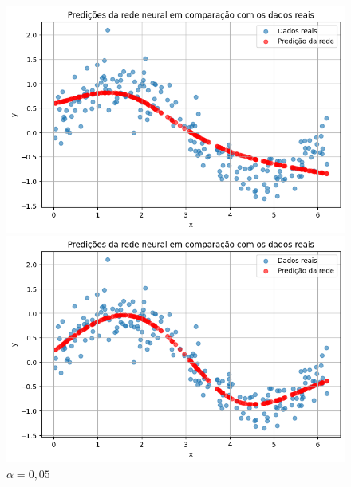 \begin{figure}[htb]
	\centering
	\begin{minipage}{0.45\textwidth}
		\centering
		\caption{$\alpha = 0,001$}\label{tarefa03:0001:predicoes}
		
\includegraphics[width=\textwidth]{./0803_imgs/png-241110-175032242-2586281422306343440.png}
	\end{minipage}
	\hfill
	\begin{minipage}{0.45\textwidth}
		\centering
		\caption{$\alpha = 0,01$}\label{tarefa03:001:predicoes}
		
\includegraphics[width=\textwidth]{./0803_imgs/png-241110-175254024-1064294634935646228.png}
	\end{minipage}
	\vspace{1Ex}
	\begin{minipage}{0.45\textwidth}
		\centering
		\caption{$\alpha = 0,05$}\label{tarefa03:005:predicoes}
		

\end{minipage}
\end{figure}
